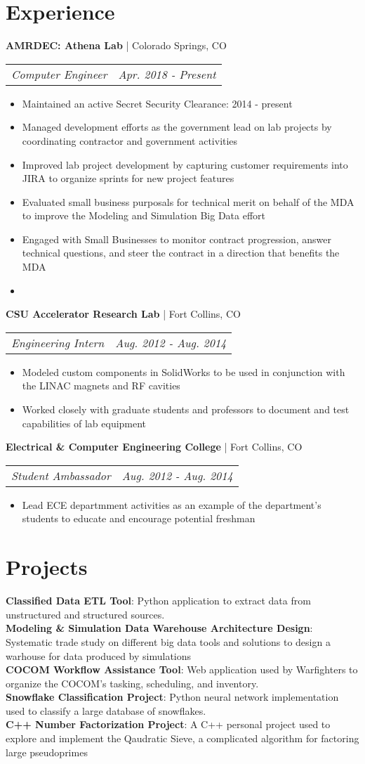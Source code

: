 \documentclass[letterpaper,11pt]{article}
\makeatletter
\newcommand{\resumeItem}[1]{
  \item\small{#1}
}
\newcommand{\resumeItemListStart}{\begin{itemize}[itemsep=1mm, parsep=0mm, topsep=0mm]}
\newcommand{\resumeItemListEnd}{\end{itemize}}
\newcommand{\sectionHeader}[2]{
	\vspace{5pt}\small{ \textbf{#1} | #2}
}
\newcommand{\projectItem}[2]{
  \vspace{5pt}\small{\textbf{#1}{: #2}} \\
}
\newcommand{\sectionSubHeader}[2]{
	\begin{tabular*}{\textwidth}{l@{\extracolsep{\fill}}r}
		\quad\textit{\small{#1}} & \textit{\small{#2}}
	\end{tabular*}
}
\makeatother
\begin{document}
\section{Experience}
    \sectionHeader{AMRDEC: Athena Lab}{Colorado Springs, CO}
   		\sectionSubHeader{Computer Engineer}{Apr. 2018 - Present}
			\resumeItemListStart
				\resumeItem{Maintained an active Secret Security Clearance: 2014 - present}
		   		\resumeItem{Managed development efforts as the government lead on lab projects by coordinating contractor and government activities }
		   		\resumeItem{Improved lab project development by capturing customer requirements into JIRA to organize sprints for new project features}
		   		\resumeItem{Evaluated small business purposals for technical merit on behalf of the MDA to improve the Modeling and Simulation Big Data effort}
		   		\resumeItem{Engaged with Small Businesses to monitor contract progression, answer technical questions, and steer the contract in a direction that benefits the MDA}
		   		\resumeItem{}
		   \resumeItemListEnd
   	\sectionHeader{CSU Accelerator Research Lab}{Fort Collins, CO}
   		\sectionSubHeader{Engineering Intern}{Aug. 2012 - Aug. 2014}
   			\resumeItemListStart
   				\resumeItem{Modeled custom components in SolidWorks to be used in conjunction with the LINAC magnets and RF cavities}
   				\resumeItem{Worked closely with graduate students and professors to document and test capabilities of lab equipment}
   			\resumeItemListEnd
   	\sectionHeader{Electrical \& Computer Engineering College}{Fort Collins, CO}
   		\sectionSubHeader{Student Ambassador}{Aug. 2012 - Aug. 2014}
   			\resumeItemListStart
   				\resumeItem{Lead ECE departmment activities as an example of the department’s students to educate and encourage potential freshman}
   			\resumeItemListEnd
\section{Projects}
	\projectItem{Classified Data ETL Tool}{Python application to extract data from unstructured and structured sources. }
	\projectItem{Modeling \& Simulation Data Warehouse Architecture Design}{Systematic trade study on different big data tools and solutions to design a warhouse for data produced by simulations}
	\projectItem{COCOM Workflow Assistance Tool}{Web application used by Warfighters to organize the COCOM's tasking, scheduling, and inventory. }
	\projectItem{Snowflake Classification Project}{Python neural network implementation used to classify a large database of snowflakes. }
	\projectItem{C++ Number Factorization Project}{A C++ personal project used to explore and implement the Qaudratic Sieve, a complicated algorithm for factoring large pseudoprimes}
\end{document}
